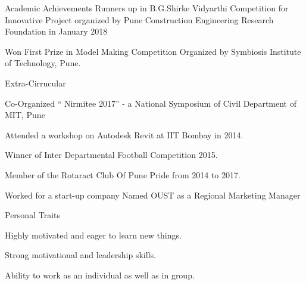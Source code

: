 \documentclass{resume} %
\begin{document}

\begin{rSection}{Academic Achievements} 
 Runners up in B.G.Shirke Vidyarthi Competition for Innovative Project organized by Pune Construction Engineering Research Foundation in January 2018
\item Won First Prize in Model Making Competition Organized by Symbiosis Institute of Technology, Pune.
\end{rSection}

\newpage

\begin{rSection}{Extra-Cirrucular} \itemsep -3pt
\item Co-Organized “ Nirmitee 2017” - a National Symposium of Civil Department of MIT, Pune
\item Attended a workshop on Autodesk Revit at IIT Bombay in 2014.
\item Winner of Inter Departmental Football Competition 2015.
\item Member of the  Rotaract Club Of Pune Pride from 2014 to 2017.
\item Worked for a start-up company Named OUST as a Regional Marketing Manager

\end{rSection}

\begin{rSection}{Personal Traits}
\item Highly motivated and eager to learn new things.
\item Strong motivational and leadership skills.
\item Ability to work as an individual as well as in group.
\end{rSection}
\end{document}
